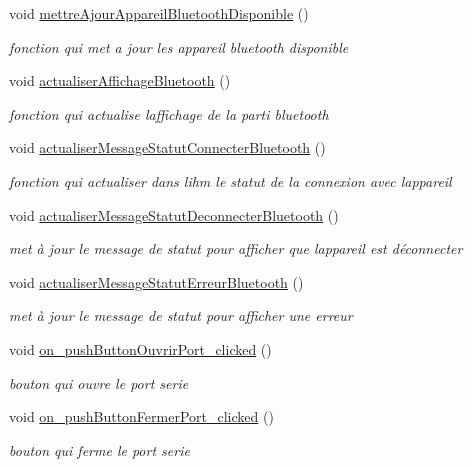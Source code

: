 \begin{DoxyCompactItemize}
void \hyperlink{class_ihm_a9d9ac22e5d73a010bc75a1fcf2e7ddcb}{mettre\+Ajour\+Appareil\+Bluetooth\+Disponible} ()
\begin{DoxyCompactList}\small\item\em fonction qui met a jour les appareil bluetooth disponible \end{DoxyCompactList}\item 
void \hyperlink{class_ihm_a02118154be39cdd3de7fdbdbe396a534}{actualiser\+Affichage\+Bluetooth} ()
\begin{DoxyCompactList}\small\item\em fonction qui actualise l\textquotesingle{}affichage de la parti bluetooth \end{DoxyCompactList}\item 
void \hyperlink{class_ihm_a5d7e6bdacfedc0f0dc4d7b3516454788}{actualiser\+Message\+Statut\+Connecter\+Bluetooth} ()
\begin{DoxyCompactList}\small\item\em fonction qui actualiser dans l\textquotesingle{}ihm le statut de la connexion avec l\textquotesingle{}appareil \end{DoxyCompactList}\item 
void \hyperlink{class_ihm_ad73cc62bafa9c43288f69fbac2b80508}{actualiser\+Message\+Statut\+Deconnecter\+Bluetooth} ()
\begin{DoxyCompactList}\small\item\em met à jour le message de statut pour afficher que l\textquotesingle{}appareil est déconnecter \end{DoxyCompactList}\item 
void \hyperlink{class_ihm_a29b4c5fba871a30f7f2e5fbe08a2087d}{actualiser\+Message\+Statut\+Erreur\+Bluetooth} ()
\begin{DoxyCompactList}\small\item\em met à jour le message de statut pour afficher une erreur \end{DoxyCompactList}\item 
void \hyperlink{class_ihm_a9ce167b94baead6e318bbd0c5254f842}{on\+\_\+push\+Button\+Ouvrir\+Port\+\_\+clicked} ()
\begin{DoxyCompactList}\small\item\em bouton qui ouvre le port serie \end{DoxyCompactList}\item 
void \hyperlink{class_ihm_abcdae03ce7e83266fb9d3e795df8a171}{on\+\_\+push\+Button\+Fermer\+Port\+\_\+clicked} ()
\begin{DoxyCompactList}\small\item\em bouton qui ferme le port serie \end{DoxyCompactList}\item 

\end{DoxyCompactItemize}
